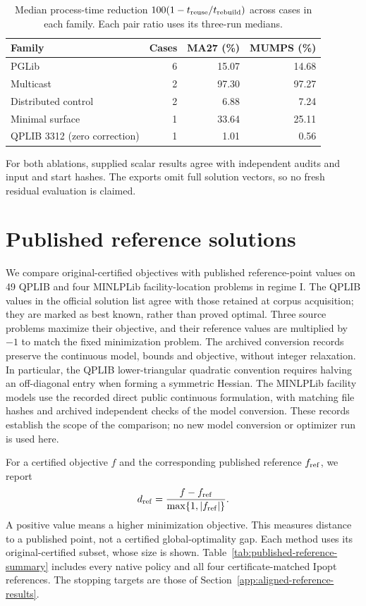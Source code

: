 \documentclass[pdflatex,sn-mathphys-num]{sn-jnl}
\theoremstyle{thmstyleone}
\theoremstyle{thmstylethree}
\begin{document}
\begin{table}[!htbp]
\centering\small
\caption{Median process-time reduction $100(1-t_{\rm reuse}/t_{\rm rebuild})$
across cases in each family. Each pair ratio uses its three-run medians.}
\label{tab:persistence-families}
\begin{tabular}{@{}lrrr@{}}
\toprule
Family & Cases & MA27 (\%) & MUMPS (\%)\\
\midrule
PGLib & 6 & 15.07 & 14.68\\
Multicast & 2 & 97.30 & 97.27\\
Distributed control & 2 & 6.88 & 7.24\\
Minimal surface & 1 & 33.64 & 25.11\\
QPLIB 3312 (zero correction) & 1 & 1.01 & 0.56\\
\bottomrule
\end{tabular}
\end{table}
For both ablations, supplied scalar results agree with independent audits
and input and start hashes. The exports omit full
solution vectors, so no fresh residual evaluation is claimed.
\FloatBarrier

\section{Published reference solutions}\label{app:published-reference-values}
We compare original-certified objectives with published reference-point
values on 49 QPLIB and four MINLPLib facility-location problems in regime I.
The QPLIB values in the official solution list agree with those retained
at corpus acquisition; they are marked as best known, rather than proved
optimal. Three source problems maximize their objective, and their
reference values are multiplied by $-1$ to match the fixed minimization
problem. The archived conversion records preserve the continuous model,
bounds and objective, without integer relaxation. In particular, the
QPLIB lower-triangular quadratic convention requires halving an
off-diagonal entry when forming a symmetric Hessian. The MINLPLib
facility models use the recorded direct public continuous formulation,
with matching file hashes and archived independent checks of the model
conversion. These records establish the scope of the comparison; no new
model conversion or optimizer run is used here.

For a certified objective $f$ and the corresponding published reference
$f_{\rm ref}$, we report
\[
 d_{\rm ref}=\frac{f-f_{\rm ref}}{\max\{1,|f_{\rm ref}|\}}.
\]
A positive value means a higher minimization objective. This measures
distance to a published point, not a certified global-optimality gap.
Each method uses its original-certified subset, whose size is shown. Table~\ref{tab:published-reference-summary} includes every native
policy and all four certificate-matched Ipopt references. The stopping
targets are those of Section~\ref{app:aligned-reference-results}.
\end{document}
